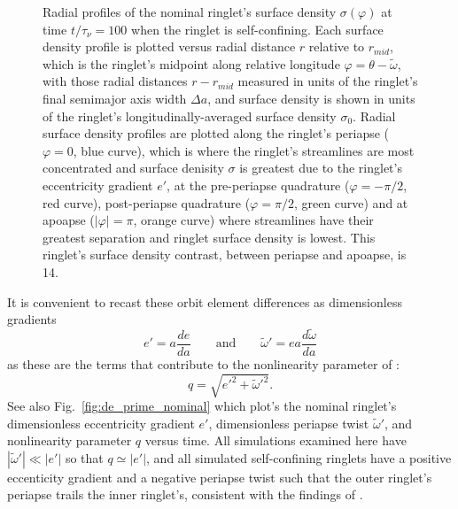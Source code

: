 \documentclass[preprint]{aastex62}
\begin{document}
\begin{figure}
    \caption{
        \label{fig:radial_sigma_nominal}
        Radial profiles of the nominal ringlet's surface density $\sigma(\varphi)$ at time $t/\tau_\nu=100$
        when the ringlet is self-confining. Each surface density profile is plotted versus radial distance $r$ 
        relative to $r_{mid}$, which is the ringlet's midpoint along relative longitude $\varphi = \theta-\tilde{\omega}$,
        with those radial distances $r - r_{mid}$ measured in units of the ringlet's final semimajor axis width $\Delta a$,
        and surface density is shown in units of the ringlet's longitudinally-averaged surface density $\sigma_0$.
        Radial surface density profiles are plotted along the ringlet's periapse ($\varphi=0$, blue curve), which is 
        where the ringlet's streamlines are most concentrated and surface denisity $\sigma$ is
        greatest due to the ringlet's eccentricity gradient $e'$, at the pre-periapse
        quadrature ($\varphi=-\pi/2$, red curve), post-periapse
        quadrature ($\varphi=\pi/2$, green curve)
        and at apoapse ($|\varphi|=\pi$, orange curve) where streamlines have their greatest separation
        and ringlet surface density is lowest. This ringlet's surface density contrast, between periapse and
        apoapse, is 14.
    }
\end{figure}

It is convenient to recast these orbit element differences as dimensionless gradients
\begin{equation}
    \label{eqn:e_prime}
    e' = a\frac{de}{da}
    \qquad\mbox{and}\qquad
    \tilde{\omega}' = ea\frac{d\tilde{\omega}}{da}
\end{equation}
as these are the terms that contribute to the nonlinearity parameter of \cite{BGT83}:
\begin{equation}
    \label{eqn:q}
    q = \sqrt{e'^2 + \tilde{\omega}'^2}.
\end{equation}
See also Fig.\ \ref{fig:de_prime_nominal} which plot's the nominal
ringlet's dimensionless eccentricity gradient $e'$, dimensionless periapse twist $\tilde{\omega}'$,
and nonlinearity parameter $q$ versus time. All simulations examined here have
$|\tilde{\omega}'|\ll|e'|$ so that $q\simeq|e'|$, and all simulated self-confining ringlets
have a positive eccenticity gradient and a negative periapse twist such that
the outer ringlet's periapse trails the inner ringlet's, consistent with the findings of
\cite{BGT83}.\vfil
\end{document}
